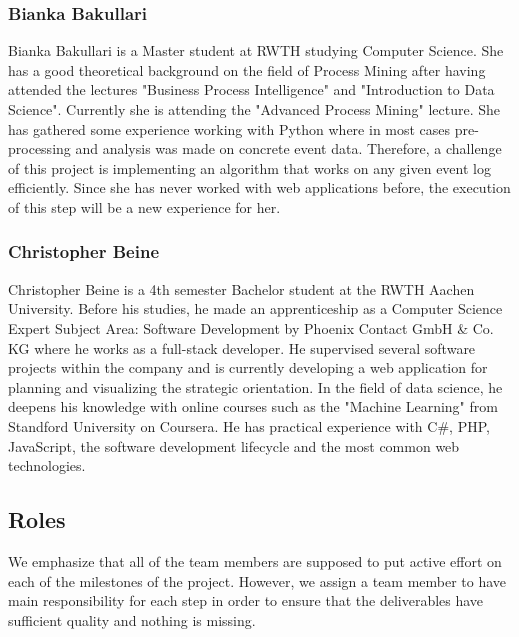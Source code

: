 \documentclass[notitlepage]{article}
\begin{document}
\begin{flushleft}
\subsubsection*{Bianka Bakullari}

Bianka Bakullari is a Master student at RWTH studying Computer Science.
She has a good theoretical background on the field of Process Mining after having attended the lectures "Business Process Intelligence" and "Introduction to Data Science". 
Currently she is attending the "Advanced Process Mining" lecture.
She has gathered some experience working with Python where in most cases pre-processing and analysis was made on concrete event data. Therefore, a challenge of this project is implementing an algorithm that works on any given event log efficiently.
Since she has never worked with web applications before, the execution of this step will be a new experience for her.


\subsubsection*{Christopher Beine}
Christopher Beine is a 4th semester Bachelor student at the RWTH Aachen University. Before his studies, he made an apprenticeship as a Computer Science Expert Subject Area: Software Development 
by Phoenix Contact GmbH \& Co. KG where he works as a full-stack developer. He supervised several software projects within the company and is currently 
developing a web application for planning and visualizing the strategic orientation. In the field of data science, he deepens his knowledge with online courses such as the "Machine Learning" from Standford University on Coursera. 
He has practical experience with C\#, PHP, JavaScript, the software development lifecycle and the most common web technologies.    


\subsection{Roles}
We emphasize that all of the team members are supposed to put active effort on each of the milestones of the project.
However, we assign a team member to have main responsibility for each step in order to ensure that the deliverables have sufficient quality and nothing is missing.


\end{flushleft}
\end{document}
